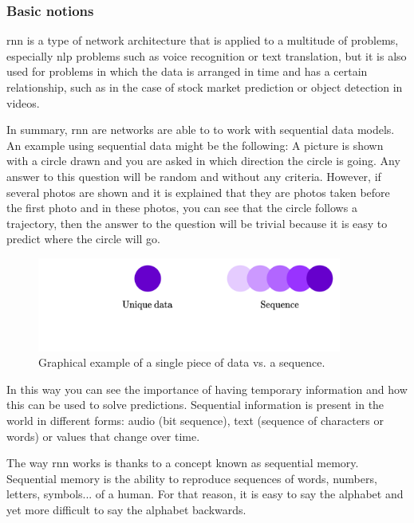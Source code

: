 \subsubsection{Basic notions}\label{rnn_theory}

\acrfull{rnn}  is a type of network architecture that is applied to a multitude of problems, especially \acrshort{nlp} problems such as voice recognition or text translation, but it is also used for problems in which the data is arranged in time and has a certain relationship, such as in the case of stock market prediction or object detection in videos.
\newline


In summary, \acrshort{rnn} are networks are able to to work with sequential data models. An example using sequential data might be the following: A picture is shown with a circle drawn and you are asked in which direction the circle is going. Any answer to this question will be random and without any criteria. However, if several photos are shown and it is explained that they are photos taken before the first photo and in these photos, you can see that the circle follows a trajectory, then the answer to the question will be trivial because it is easy to predict where the circle will go.

\begin{figure}[H]
    \centering
    \includegraphics[width=10cm]{images/state-of-art/rnn/ball.png}
    \caption{Graphical example of a single piece of data vs. a sequence.}
    \label{fig:basic_network}
\end{figure}

In this way you can see the importance of having temporary information and how this can be used to solve predictions. Sequential information is present in the world in different forms: audio (bit sequence), text (sequence of characters or words) or values that change over time.
\newline

The way \acrshort{rnn} works is thanks to a concept known as sequential memory. Sequential memory is the ability to reproduce sequences of words, numbers, letters, symbols... of a human. For that reason, it is easy to say the alphabet and yet more difficult to say the alphabet backwards.
\newline

